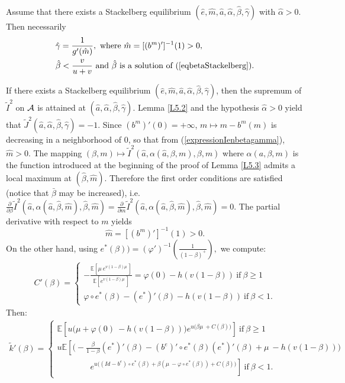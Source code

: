 \documentclass{svjour3}
\begin{document}
\begin{lemma}\label{L5.4}
Assume that 
there exists a Stackelberg equilibrium $(\hat e, \hat m, \hat a, \hat\alpha, \hat\beta,\hat\gamma)$ with $\hat\alpha>0$. Then  necessarily 
\begin{eqnarray}
\label{eqdegamma}
&\hat\gamma=\frac{1}{g'(\hat m)},~\mbox{where}~\hat m=[(b^m)']^{-1}(1)>0,
\\
\label{eqdebeta}
&\hat\beta<\frac{v}{u+v}~\mbox{and}~\hat\beta~\mbox{is a solution of (\ref{eqbetaStackelberg})}.
\end{eqnarray}
\end{lemma}
\proof
If there exists a Stackelberg equilibrium $(\hat e, \hat m, \hat a, \hat\alpha, \hat\beta,\hat\gamma)$, then the supremum of $\tilde I^2$ on ${\cal A}$ is attained at $(\hat a, \hat\alpha, \hat\beta,\hat\gamma)$. Lemma \ref{L5.2} and the hypothesis $\hat \alpha>0$ yield that $\tilde J^2(\hat a, \hat\alpha, \hat\beta,\hat\gamma)=-1$. Since $(b^m)'(0)=+\infty$, $m\mapsto m-b^m(m)$ is decreasing in a neighborhood of $0$, so that from (\ref{expressionIenbetagamma}), $\hat m>0$. The mapping $(\beta,m)\mapsto \tilde I^2(\hat a,\alpha(\hat a,\beta,m),\beta,m)$ where $\alpha(a,\beta,m)$ is the function introduced at the beginning of the proof of Lemma \ref{L5.3} admits a local maximum at $(\hat\beta,\hat m)$. Therefore the first order conditions are satisfied (notice that $\bar{\beta}$ may be increased), i.e. $\frac{\partial}{\partial \beta} \tilde I^2(\hat a,\alpha(\hat a,\hat\beta,\hat m),\hat\beta,\hat m)=\frac{\partial}{\partial m} \tilde I^2(\hat a,\alpha(\hat a,\hat\beta,\hat m),\hat\beta,\hat m)=0$. 
 The partial derivative with respect to $m$ yields
 $$
\hat m=[(b^m)']^{-1}(1)>0.
$$
 On the other hand, using $e^*(\beta))=(\varphi')^{-1}(\frac{1}{(1-\beta)^+}),$ 
 we compute:
\begin{align*}
C'(\beta)=\begin{cases}
-\frac{{\mathbb{E}}\left[\mu~e^{v(1-\beta)\mu~}\right]}{{\mathbb{E}}\left[ e^{v(1-\beta)\mu~}\right]}=\varphi(0)-h(v(1-\beta))~\mbox{if}~\beta\geq 1\\
\varphi\circ e^*(\beta)-(e^*)'(\beta)-h(v(1-\beta))~\mbox{if}~\beta<1.
\end{cases}
\end{align*}
Then:
\begin{align*}
\tilde k'(\beta)=\begin{cases}
{\mathbb{E}} \left[u\Big(\mu+\varphi(0)~-h(v(1-\beta))\Big)e^{u\big(\beta\mu~+C(\beta)\big)}\right]~\mbox{if}~\beta\geq 1\\
u{\mathbb{E}}\left[\Big(-\frac{\beta}{1-\beta}(e^*)'(\beta)-(b^e)'\circ e^*(\beta)(e^*)'(\beta)+\mu~-h(v(1-\beta))\Big)
\right.\\
\left.
\qquad\qquad e^{u\big((Id-b^e)\circ e^*(\beta)+\beta(\mu~-\varphi\circ e^*(\beta))+C(\beta)\big)}\right]~\mbox{if}~\beta<1.
\end{cases}
\end{align*}
\end{document}
